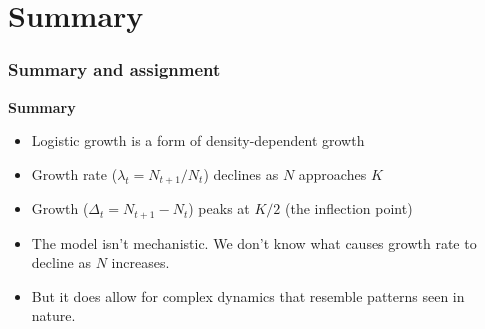 \documentclass[color=usenames,dvipsnames]{beamer}\usepackage[]{graphicx}\usepackage[]{color}
\begin{document}
\section{Summary}







\begin{frame}
  \frametitle{Summary and assignment}
  \large
  {\bf Summary}
  \begin{itemize}[<+->]
    \item Logistic growth is a form of density-dependent growth
    \item Growth rate ($\lambda_t=N_{t+1}/N_t$) declines as $N$ approaches $K$
    \item Growth ($\Delta_t=N_{t+1}-N_t$) peaks at $K/2$ (the
      inflection point)
    \item The model isn't mechanistic. We don't know what causes
      growth rate to decline as $N$ increases.
    \item But it does allow for complex dynamics that resemble
      patterns seen in nature.
  \end{itemize}
  \vfill
\end{frame}





\end{document}
